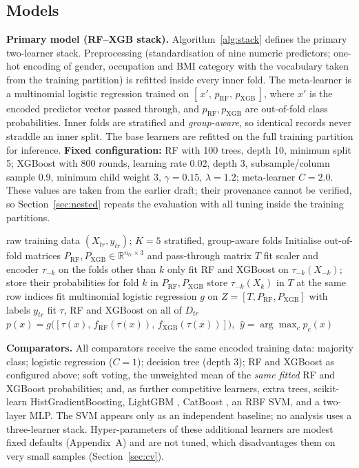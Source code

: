 \documentclass[11pt,a4paper]{article}
\begin{document}
\subsection{Models}
\textbf{Primary model (RF--XGB stack).} Algorithm~\ref{alg:stack} defines the primary two-learner stack. Preprocessing (standardisation of nine numeric predictors; one-hot encoding of gender, occupation and BMI category with the vocabulary taken from the training partition) is refitted inside every inner fold. The meta-learner is a multinomial logistic regression trained on $[\,x',\,p_{\mathrm{RF}},\,p_{\mathrm{XGB}}\,]$, where $x'$ is the encoded predictor vector passed through, and $p_{\mathrm{RF}},p_{\mathrm{XGB}}$ are out-of-fold class probabilities. Inner folds are stratified and \emph{group-aware}, so identical records never straddle an inner split. The base learners are refitted on the full training partition for inference. \textbf{Fixed configuration:} RF with 100 trees, depth 10, minimum split 5; XGBoost with 800 rounds, learning rate 0.02, depth 3, subsample/column sample 0.9, minimum child weight 3, $\gamma=0.15$, $\lambda=1.2$; meta-learner $C=2.0$. These values are taken from the earlier draft; their provenance cannot be verified, so Section~\ref{sec:nested} repeats the evaluation with all tuning inside the training partitions.

\begin{algorithm}[t]
\caption{Fold-isolated RF--XGB stacking (training partition $D_{tr}$, new record $x$)}\label{alg:stack}
\begin{algorithmic}[1]
\Require raw training data $(X_{tr},y_{tr})$; $K=5$ stratified, group-aware folds
\State Initialise out-of-fold matrices $P_{\mathrm{RF}},P_{\mathrm{XGB}}\in\mathbb{R}^{n_{tr}\times 3}$ and pass-through matrix $T$
  \State fit scaler and encoder $\tau_{-k}$ on the folds other than $k$ only
  \State fit RF and XGBoost on $\tau_{-k}(X_{-k})$; store their probabilities for fold $k$ in $P_{\mathrm{RF}},P_{\mathrm{XGB}}$
  \State store $\tau_{-k}(X_{k})$ in $T$ at the same row indices
\EndFor
\State fit multinomial logistic regression $g$ on $Z=[T,P_{\mathrm{RF}},P_{\mathrm{XGB}}]$ with labels $y_{tr}$
\State fit $\tau$, RF and XGBoost on all of $D_{tr}$
\State \Return $p(x)=g\big([\tau(x),\,f_{\mathrm{RF}}(\tau(x)),\,f_{\mathrm{XGB}}(\tau(x))]\big)$, $\ \hat y=\arg\max_c p_c(x)$
\end{algorithmic}
\end{algorithm}

\textbf{Comparators.} All comparators receive the same encoded training data: majority class; logistic regression ($C=1$); decision tree (depth 3); RF and XGBoost as configured above; soft voting, the unweighted mean of the \emph{same fitted} RF and XGBoost probabilities; and, as further competitive learners, extra trees, scikit-learn HistGradientBoosting, LightGBM \citep{ke2017}, CatBoost \citep{prokhorenkova2018}, an RBF SVM, and a two-layer MLP. The SVM appears only as an independent baseline; no analysis uses a three-learner stack. Hyper-parameters of these additional learners are modest fixed defaults (Appendix~A) and are not tuned, which disadvantages them on very small samples (Section~\ref{sec:cv}).
\end{document}
